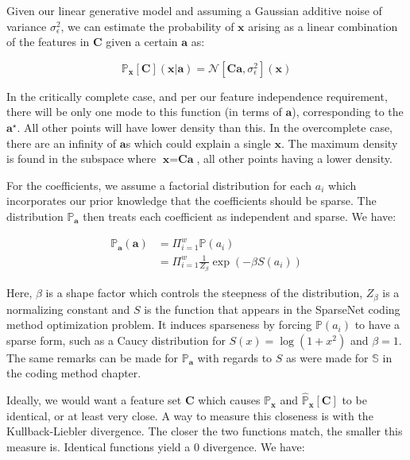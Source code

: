 \documentclass[12pt,a4paper,oneside,english]{UPBThesis}
\begin{document}
Given our linear generative model and assuming a Gaussian additive noise of variance $\sigma_\epsilon^2$, we can estimate the probability of $\textbf{x}$ arising as a linear combination of the features in $\textbf{C}$ given a certain $\textbf{a}$ as:

\begin{equation*}
\mathbb{P}_\textbf{x}[\textbf{C}](\textbf{x}\left|\right.\textbf{a}) = \mathcal{N}[\textbf{C}\textbf{a},\sigma_\epsilon^2](\textbf{x})
\end{equation*}

In the critically complete case, and per our feature independence requirement, there will be only one mode to this function (in terms of $\textbf{a}$), corresponding to the $\textbf{a}^\star$. All other points will have lower density than this. In the overcomplete case, there are an infinity of $\textbf{a}$s which could explain a single $\textbf{x}$. The maximum density is found in the subspace where $\textbf{x} = \textbf{C}\textbf{a}$, all other points having a lower density.

For the coefficients, we assume a factorial distribution for each $a_i$ which incorporates our prior knowledge that the coefficients should be sparse. The distribution $\mathbb{P}_\textbf{a}$ then treats each coefficient as independent and sparse. We have:

\begin{align*}
\mathbb{P}_\textbf{a}(\textbf{a}) & = \Pi_{i=1}^{w}{\mathbb{P}(a_i)} \\
& = \Pi_{i=1}^{w} {\frac{1}{Z_\beta} \exp(-\beta S(a_i))}
\end{align*}

Here, $\beta$ is a shape factor which controls the steepness of the distribution, $Z_\beta$ is a normalizing constant and $S$ is the function that appears in the SparseNet coding method optimization problem. It induces sparseness by forcing $\mathbb{P}(a_i)$ to have a sparse form, such as a Caucy distribution for $S(x)=\log(1 + x^2)$ and $\beta=1$. The same remarks can be made for $\mathbb{P}_\textbf{a}$ with regards to $S$ as were made for $\mathbb{S}$ in the coding method chapter.

Ideally, we would want a feature set $\textbf{C}$ which causes $\mathbb{P}_\textbf{x}$ and $\hat{\mathbb{P}}_\textbf{x}[\textbf{C}]$ to be identical, or at least very close. A way to measure this closeness is with the Kullback-Liebler divergence. The closer the two functions match, the smaller this measure is. Identical functions yield a $0$ divergence. We have:
\end{document}
